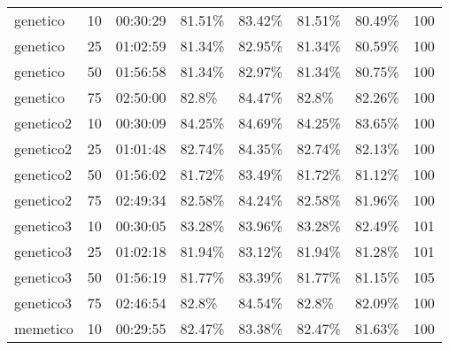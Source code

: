 \begin{table}[htp]
{\begin{tabular}{lp{2cm}lp{2cm}p{2cm}p{2cm}p{2cm}p{2.2cm}}
            genetico                 & 10                          & 00:30:29                & 81.51\%                          & 83.42\% & 81.51\% & 80.49\% & 100 \\
            genetico                 & 25                          & 01:02:59                & 81.34\%                          & 82.95\% & 81.34\% & 80.59\% & 100 \\
            genetico                 & 50                          & 01:56:58                & 81.34\%                          & 82.97\% & 81.34\% & 80.75\% & 100 \\
            genetico                 & 75                          & 02:50:00                & 82.8\%                           & 84.47\% & 82.8\%  & 82.26\% & 100 \\
            genetico2                & 10                          & 00:30:09                & 84.25\%                          & 84.69\% & 84.25\% & 83.65\% & 100 \\
            genetico2                & 25                          & 01:01:48                & 82.74\%                          & 84.35\% & 82.74\% & 82.13\% & 100 \\
            genetico2                & 50                          & 01:56:02                & 81.72\%                          & 83.49\% & 81.72\% & 81.12\% & 100 \\
            genetico2                & 75                          & 02:49:34                & 82.58\%                          & 84.24\% & 82.58\% & 81.96\% & 100 \\
            genetico3                & 10                          & 00:30:05                & 83.28\%                          & 83.96\% & 83.28\% & 82.49\% & 101 \\
            genetico3                & 25                          & 01:02:18                & 81.94\%                          & 83.12\% & 81.94\% & 81.28\% & 101 \\
            genetico3                & 50                          & 01:56:19                & 81.77\%                          & 83.39\% & 81.77\% & 81.15\% & 105 \\
            genetico3                & 75                          & 02:46:54                & 82.8\%                           & 84.54\% & 82.8\%  & 82.09\% & 100 \\
            memetico                 & 10                          & 00:29:55                & 82.47\%                          & 83.38\% & 82.47\% & 81.63\% & 100 \\

\end{tabular}}
\end{table}

